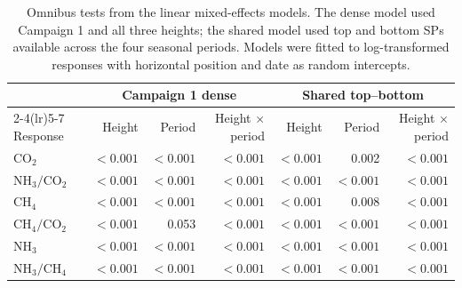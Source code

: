 \begin{table}[htbp]
\centering
\small
\caption{Omnibus tests from the linear mixed-effects models. The dense model used Campaign 1 and all three heights; the shared model used top and bottom SPs available across the four seasonal periods. Models were fitted to log-transformed responses with horizontal position and date as random intercepts.}
\label{tab:mixed_model_tests}
\begin{tabular}{lrrrrrr}
\toprule
& \multicolumn{3}{c}{Campaign 1 dense} & \multicolumn{3}{c}{Shared top--bottom}\\
\cmidrule(lr){2-4}\cmidrule(lr){5-7}
Response & Height & Period & Height $\times$ period & Height & Period & Height $\times$ period\\
\midrule
$\mathrm{CO_2}$ & $<0.001$ & $<0.001$ & $<0.001$ & $<0.001$ & 0.002 & $<0.001$
\\
$\mathrm{NH_3}/\mathrm{CO_2}$ & $<0.001$ & $<0.001$ & $<0.001$ & $<0.001$ & $<0.001$ & $<0.001$
\\
$\mathrm{CH_4}$ & $<0.001$ & $<0.001$ & $<0.001$ & $<0.001$ & 0.008 & $<0.001$
\\
$\mathrm{CH_4}/\mathrm{CO_2}$ & $<0.001$ & 0.053 & $<0.001$ & $<0.001$ & $<0.001$ & $<0.001$
\\
$\mathrm{NH_3}$ & $<0.001$ & $<0.001$ & $<0.001$ & $<0.001$ & $<0.001$ & $<0.001$
\\
$\mathrm{NH_3}/\mathrm{CH_4}$ & $<0.001$ & $<0.001$ & $<0.001$ & $<0.001$ & $<0.001$ & $<0.001$
\\
\bottomrule
\end{tabular}
\end{table}
